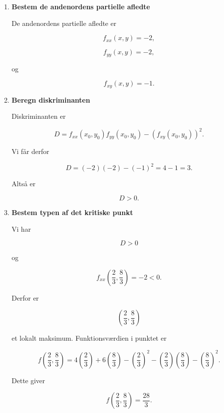 \documentclass{article}
\begin{document}
\begin{enumerate}
    \item \textbf{Bestem de andenordens partielle afledte}

    De andenordens partielle afledte er

    \[
    f_{xx}(x,y)=-2,
    \]

    \[
    f_{yy}(x,y)=-2,
    \]

    og

    \[
    f_{xy}(x,y)=-1.
    \]

    \item \textbf{Beregn diskriminanten}

    Diskriminanten er

    \[
    D=
    f_{xx}(x_0,y_0)f_{yy}(x_0,y_0)
    -
    \left(f_{xy}(x_0,y_0)\right)^2.
    \]

    Vi får derfor

    \[
    D=(-2)(-2)-(-1)^2
    =4-1
    =3.
    \]

    Altså er

    \[
    D>0.
    \]

    \item \textbf{Bestem typen af det kritiske punkt}

    Vi har

    \[
    D>0
    \]

    og

    \[
    f_{xx}\left(\frac23,\frac83\right)=-2<0.
    \]

    Derfor er

    \[
    \boxed{\left(\frac23,\frac83\right)}
    \]

    et lokalt maksimum. Funktionsværdien i punktet er

    \[
    f\left(\frac23,\frac83\right)
    =
    4\left(\frac23\right)
    +6\left(\frac83\right)
    -\left(\frac23\right)^2
    -\left(\frac23\right)\left(\frac83\right)
    -\left(\frac83\right)^2.
    \]

    Dette giver

    \[
    f\left(\frac23,\frac83\right)
    =\frac{28}{3}.
    \]


\end{enumerate}
\end{document}
